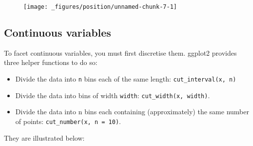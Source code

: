 \begin{figure}[H]
  \texttt{[image: \_figures/position/unnamed-chunk-7-1]}
\end{figure}

\hypertarget{sub:continuous-variables}{%
\subsection{Continuous variables}\label{sub:continuous-variables}}

To facet continuous variables, you must first discretise them. ggplot2
provides three helper functions to do so:

\begin{itemize}
\item
  Divide the data into \texttt{n} bins each of the same length:
  \texttt{cut\_interval(x,\ n)} 
\item
  Divide the data into bins of width \texttt{width}:
  \texttt{cut\_width(x,\ width)}. 
\item
  Divide the data into n bins each containing (approximately) the same
  number of points: \texttt{cut\_number(x,\ n\ =\ 10)}.
\end{itemize}

They are illustrated below:

\begin{Shaded}
\begin{Highlighting}[]
\OperatorTok{$}\StringTok{ }\OperatorTok{$}\NormalTok{)}
\OperatorTok{$}\StringTok{ }\OperatorTok{$}\NormalTok{)}
\OperatorTok{$}\StringTok{ }\OperatorTok{$}\NormalTok{)}

\StringTok{ }\OperatorTok{+}
\StringTok{  }\NormalTok{() }\OperatorTok{+}
\StringTok{  }\NormalTok{(} \NormalTok{, } \NormalTok{)}
\OperatorTok{+}\StringTok{ }\NormalTok{(}\OperatorTok{~} \NormalTok{)}
\end{Highlighting}
\end{Shaded}

